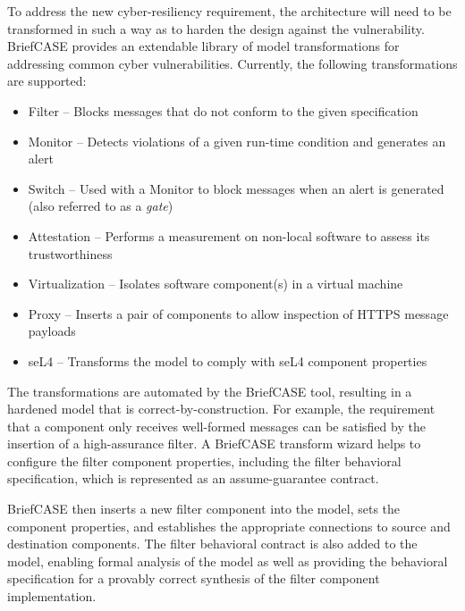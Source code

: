 To address the new cyber-resiliency requirement, the architecture will need to be transformed in such a way as to harden the design against the vulnerability.
BriefCASE provides an extendable library of model transformations for addressing common cyber vulnerabilities.  Currently, the following transformations are supported:

\begin{itemize}
	\item Filter -- Blocks messages that do not conform to the given specification
	\item Monitor -- Detects violations of a given run-time condition and generates an alert
	\item Switch -- Used with a Monitor to block messages when an alert is generated (also referred to as a \textit{gate})
	\item Attestation -- Performs a measurement on non-local software to assess its trustworthiness
	\item Virtualization -- Isolates software component(s) in a virtual machine
	\item Proxy -- Inserts a pair of components to allow inspection of %
		HTTPS message payloads
	\item seL4 -- Transforms the model to comply with seL4 component properties
\end{itemize}  

The transformations are automated by the BriefCASE tool, resulting in a hardened model that is correct-by-construction.  
For example, the requirement that a component only receives well-formed messages can be satisfied by the insertion of a high-assurance filter.  
A BriefCASE transform wizard 
helps to configure the filter component properties, including the filter behavioral specification, which is represented as an assume-guarantee contract.


BriefCASE then inserts a new filter component into the model, sets the component properties, and establishes the appropriate connections to source and destination components. The filter behavioral contract is also added to the model, enabling formal analysis of the model as well as providing the behavioral specification for a provably correct synthesis of the filter component implementation.

